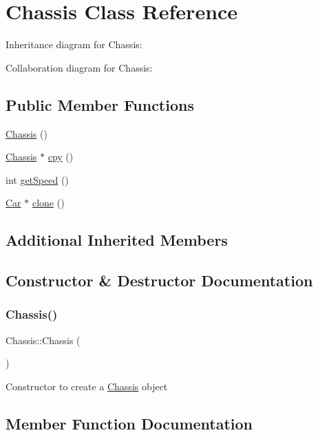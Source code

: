 \hypertarget{classChassis}{}\section{Chassis Class Reference}
\label{classChassis}


Inheritance diagram for Chassis\+:


Collaboration diagram for Chassis\+:
\subsection*{Public Member Functions}
\begin{DoxyCompactItemize}
\item 
\hyperlink{classChassis_abff4a95e18eea726bccbb647939b2141}{Chassis} ()
\item 
\hyperlink{classChassis}{Chassis} $\ast$ \hyperlink{classChassis_a75bfca11337766c0dda9544f27987d18}{cpy} ()
\item 
int \hyperlink{classChassis_a095c63aa079ebd8d7fc04f238fd1e56c}{get\+Speed} ()
\item 
\hyperlink{classCar}{Car} $\ast$ \hyperlink{classChassis_a2700ee5437760643c7cad46e077dcbcd}{clone} ()
\end{DoxyCompactItemize}
\subsection*{Additional Inherited Members}


\subsection{Constructor \& Destructor Documentation}
\mbox{\label{classChassis_abff4a95e18eea726bccbb647939b2141}} 
\subsubsection{\texorpdfstring{Chassis()}{Chassis()}}
{\footnotesize\ttfamily Chassis\+::\+Chassis (\begin{DoxyParamCaption}{ }\end{DoxyParamCaption})}

Constructor to create a \hyperlink{classChassis}{Chassis} object 

\subsection{Member Function Documentation}
\mbox{\label{classChassis_a2700ee5437760643c7cad46e077dcbcd}} 
